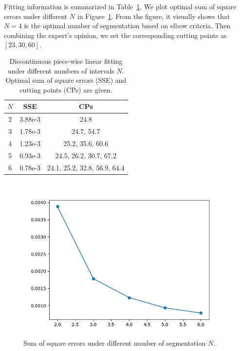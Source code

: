 \documentclass{article}
\begin{document}
Fitting information is summarized in Table~\ref{age_segmentation}. We plot optimal sum of square errors under different $N$ in Figure~\ref{age_segmentation_plot}. From the figure, it visually shows that $N=4$ is the optimal number of segmentation based on elbow criteria. Then combining the expert's opinion, we set the corresponding cutting points as $[23,30,60]$. 

\begin{table}[ht!]
	\centering
	\caption{Discontinuous piece-wise linear fitting under different numbers of intervals $N$. Optimal sum of square errors (SSE) and cutting points (CPs) are given.}
	\label{age_segmentation}
	\begin{tabular}{|c|c|c|}
		\hline
		$N$ & SSE & CPs\\
		\hline
		2 & 3.88e-3 & 24.8 \\
		\hline
		3 & 1.78e-3 & 24.7, 54.7 \\
		\hline
		4 & 1.23e-3 & 25.2, 35.6, 60.6  \\
		\hline
		5 & 0.93e-3 & 24.5, 26.2, 30.7, 67.2 \\
		\hline
		6 & 0.78e-3 & 24.1, 25.2, 32.8, 56.9, 64.4 \\
		\hline
	\end{tabular}
\end{table}

\begin{figure}[ht!]
	\centering
	\includegraphics[scale=0.5]{pic/hmm/sse_vs_n}
	\caption{Sum of square errors under different number of segmentation $N$.}
	\label{age_segmentation_plot}
\end{figure}
\end{document}
